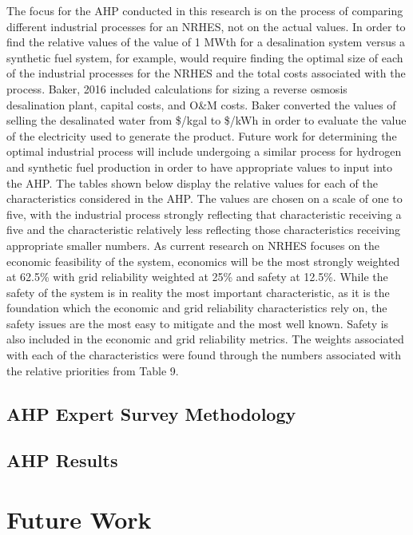 \documentclass[12pt]{UIdahoMastersThesis}
\begin{document}
The focus for the AHP conducted in this research is on the process of comparing different industrial processes for an NRHES, not on the actual values. In order to find the relative values of the value of 1 MWth for a desalination system versus a synthetic fuel system, for example, would require finding the optimal size of each of the industrial processes for the NRHES and the total costs associated with the process.  Baker, 2016  included calculations for sizing a reverse osmosis desalination plant, capital costs, and O\&M costs.  Baker converted the values of selling the desalinated water from \$/kgal to \$/kWh in order to evaluate the value of the electricity used to generate the product. Future work for determining the optimal industrial process will include undergoing a similar process for hydrogen and synthetic fuel production in order to have appropriate values to input into the AHP.  The tables shown below display the relative values for each of the characteristics considered in the AHP. The values are chosen on a scale of one to five, with the industrial process strongly reflecting that characteristic receiving a five and the characteristic relatively less reflecting those characteristics receiving appropriate smaller numbers. As current research on NRHES focuses on the economic feasibility of the system, economics will be the most strongly weighted at 62.5\% with grid reliability weighted at 25\% and safety at 12.5\%.  While the safety of the system is in reality the most important characteristic, as it is the foundation which the economic and grid reliability characteristics rely on, the safety issues are the most easy to mitigate and the most well known. Safety is also included in the economic and grid reliability metrics. The weights associated with each of the characteristics were found through the numbers associated with the relative priorities from Table 9.

\section{AHP Expert Survey Methodology}

\section{AHP Results}





\chapter{Future Work}
\end{document}
